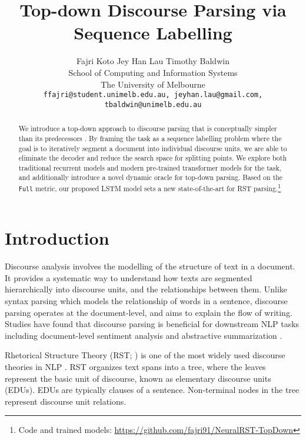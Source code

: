 \documentclass[11pt,a4paper]{article}
\title{Top-down Discourse Parsing via Sequence Labelling}
\author{Fajri Koto \qquad Jey Han Lau \qquad Timothy Baldwin\\
	School of Computing and Information Systems \\
	The University of Melbourne \\
	\texttt{\small ffajri@student.unimelb.edu.au, jeyhan.lau@gmail.com,
		tbaldwin@unimelb.edu.au} \\
}
\date{}
\begin{document}
\maketitle
\begin{abstract}



We introduce a top-down approach to discourse parsing that is
conceptually simpler than its predecessors \cite{kobayashi2020top,zhang-etal-2020-top}. By framing the task as
a sequence labelling problem where the goal is to iteratively segment a
document into individual discourse units, we are able to eliminate the decoder and reduce the search space for splitting points. We explore both traditional recurrent models and modern pre-trained transformer models for the task, and additionally introduce a novel dynamic oracle for top-down parsing.
Based on the \texttt{Full} metric, our proposed LSTM model sets a
new state-of-the-art for RST parsing.\footnote{Code and trained models: \url{https://github.com/fajri91/NeuralRST-TopDown}}



\end{abstract}



\section{Introduction}

Discourse analysis involves the modelling of the structure of text in a
document. It provides a systematic way to understand how texts are
segmented hierarchically into discourse units, and the relationships
between them. Unlike syntax parsing which models the relationship of
words in a sentence, discourse parsing operates at the document-level,
and aims to explain the flow of writing. Studies have found that
discourse parsing is beneficial for downstream NLP tasks including
document-level sentiment analysis \cite{bhatia2015better} and
abstractive summarization \cite{koto2019improved}.

Rhetorical Structure Theory (RST; \citet{mann1988rhet}) is one of the
most widely used discourse theories in NLP
\cite{hernault2010hilda, feng-hirst-2014-linear,
ji-eisenstein-2014-representation, li-etal-2016-discourse,
yu2018transition}. RST organizes text spans into a tree, where the
leaves represent the basic unit of discourse, known as elementary
discourse units (EDUs). EDUs are typically clauses of a sentence.
Non-terminal nodes in the tree represent discourse unit relations.
\end{document}

